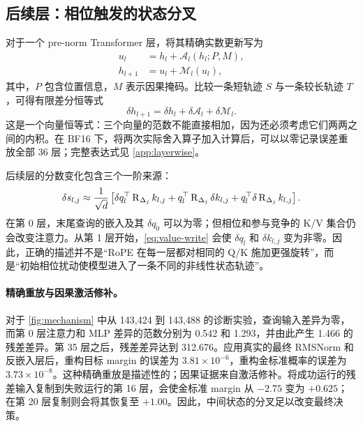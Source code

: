\subsection{后续层：相位触发的状态分叉}

对于一个 pre-norm Transformer 层，将其精确实数更新写为
\begin{align}
  u_l&=h_l+\mathcal A_l(h_l;P,M),\\
  h_{l+1}&=u_l+\mathcal M_l(u_l),
\end{align}
其中，$P$ 包含位置信息，$M$ 表示因果掩码。比较一条短轨迹 $S$ 与一条较长轨迹 $T$，可得有限差分恒等式
\begin{equation}
  \delta h_{l+1}
  =\delta h_l+\delta\mathcal A_l+\delta\mathcal M_l.
  \label{eq:layer-difference}
\end{equation}
这是一个向量恒等式：三个向量的范数不能直接相加，因为还必须考虑它们两两之间的内积。在 BF16 下，将两次实际舍入算子加入计算后，可以以零记录误差重放全部 36 层；完整表达式见 \cref{app:layerwise}。

后续层的分数变化包含三个一阶来源：
\begin{equation}
  \delta s_{l,j}\approx\frac{1}{\sqrt d}\left[
  \delta q_l^\top\operatorname{R}_{\Delta_j}k_{l,j}
  +q_l^\top\operatorname{R}_{\Delta_j}\delta k_{l,j}
  +q_l^\top\delta\operatorname{R}_{\Delta_j}k_{l,j}
  \right].
  \label{eq:three-score-sources}
\end{equation}
在第 0 层，末尾查询的嵌入及其 $\delta q_0$ 可以为零；但相位和参与竞争的 K/V 集合仍会改变注意力。从第 1 层开始，\cref{eq:value-write} 会使 $\delta q_l$ 和 $\delta k_{l,j}$ 变为非零。因此，正确的描述并不是“RoPE 在每一层都对相同的 Q/K 施加更强旋转”，而是“初始相位扰动使模型进入了一条不同的非线性状态轨迹”。

\paragraph{精确重放与因果激活修补。}
对于 \cref{fig:mechanism} 中从 143,424 到 143,488 的诊断实验，查询输入差异为零，而第 0 层注意力和 MLP 差异的范数分别为 0.542 和 1.293，并由此产生 1.466 的残差差异。第 35 层之后，残差差异达到 312.676。应用真实的最终 RMSNorm 和反嵌入层后，重构目标 margin 的误差为 $3.81\times10^{-6}$，重构金标准概率的误差为 $3.73\times10^{-8}$。这种精确重放是描述性的；因果证据来自激活修补。将成功运行的残差输入复制到失败运行的第 16 层，会使金标准 margin 从 $-2.75$ 变为 $+0.625$；在第 20 层复制则会将其恢复至 $+1.00$。因此，中间状态的分叉足以改变最终决策。
